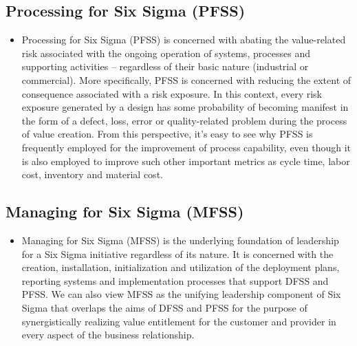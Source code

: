 \documentclass[11pt]{article} %
\begin{document}
\subsection{Processing for Six Sigma (PFSS)}
\begin{itemize}
\item Processing for Six Sigma (PFSS) is concerned with abating the value-related risk associated with the ongoing operation of systems, processes and supporting activities – regardless of their basic nature (industrial or commercial).  More specifically, PFSS is concerned with reducing the extent of consequence associated with a risk exposure.  In this context, every risk exposure generated by a design has some probability of becoming manifest in the form of a defect, loss, error or quality-related problem during the process of value creation.  From this perspective, it’s easy to see why PFSS is frequently employed for the improvement of process capability, even though it is also employed to improve such other important metrics as cycle time, labor cost, inventory and material cost.
\end{itemize}


\subsection{Managing for Six Sigma (MFSS)}
\begin{itemize}
\item Managing for Six Sigma (MFSS) is the underlying foundation of leadership for a Six Sigma initiative regardless of its nature.  It is concerned with the creation, installation, initialization and utilization of the deployment plans, reporting systems and implementation processes that support DFSS and PFSS.  We can also view MFSS as the unifying leadership component of Six Sigma that overlaps the aims of DFSS and PFSS for the purpose of synergistically realizing value entitlement for the customer and provider in every aspect of the business relationship.
\end{itemize}
\end{document}
